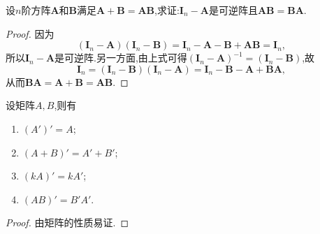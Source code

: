 \documentclass[../../main.tex]{subfiles}%
\begin{document}
\begin{proposition}
设\(n\)阶方阵\(\boldsymbol{A}\)和\(\boldsymbol{B}\)满足\(\boldsymbol{A}+\boldsymbol{B}=\boldsymbol{A}\boldsymbol{B}\),求证:\(\boldsymbol{I}_{n}-\boldsymbol{A}\)是可逆阵且\(\boldsymbol{A}\boldsymbol{B}=\boldsymbol{B}\boldsymbol{A}\).
\end{proposition}
\begin{proof}

因为
\[
(\boldsymbol{I}_{n}-\boldsymbol{A})(\boldsymbol{I}_{n}-\boldsymbol{B})=\boldsymbol{I}_{n}-\boldsymbol{A}-\boldsymbol{B}+\boldsymbol{A}\boldsymbol{B}=\boldsymbol{I}_{n},
\]
所以\(\boldsymbol{I}_{n}-\boldsymbol{A}\)是可逆阵.另一方面,由上式可得\((\boldsymbol{I}_{n}-\boldsymbol{A})^{-1}=(\boldsymbol{I}_{n}-\boldsymbol{B})\),故
\[
\boldsymbol{I}_{n}=(\boldsymbol{I}_{n}-\boldsymbol{B})(\boldsymbol{I}_{n}-\boldsymbol{A})=\boldsymbol{I}_{n}-\boldsymbol{B}-\boldsymbol{A}+\boldsymbol{B}\boldsymbol{A},
\]
从而\(\boldsymbol{B}\boldsymbol{A}=\boldsymbol{A}+\boldsymbol{B}=\boldsymbol{A}\boldsymbol{B}\).

\end{proof}

\begin{proposition}[矩阵转置的性质]\label{proposition:矩阵转置的性质}
设矩阵$A,B$,则有
\begin{enumerate}
\item $(A')'=A$;
\item $(A+B)'=A'+B'$;
\item $(kA)'=kA'$;
\item $(AB)'=B'A'$.
\end{enumerate}
\end{proposition}
\begin{proof}

由矩阵的性质易证.

\end{proof}
\end{document}
